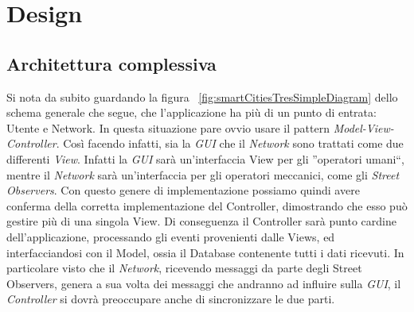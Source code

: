 \documentclass[a4paper,12pt]{report}
\begin{document}
\chapter{Design}

\section{Architettura complessiva}

Si nota da subito guardando la figura 
~\ref{fig:smartCitiesTresSimpleDiagram} dello schema generale che segue, 
che l'applicazione ha più di un punto di entrata: Utente e Network. In questa 
situazione pare ovvio usare il pattern \textit{Model-View-Controller}. Così 
facendo infatti, sia la \textit{GUI} che il \textit{Network} sono trattati come 
due differenti \textit{View}. Infatti la \textit{GUI} sarà un'interfaccia View 
per gli ''operatori umani``, mentre il \textit{Network} sarà un'interfaccia per 
gli operatori meccanici, come gli \textit{Street Observers}.
Con questo genere di implementazione possiamo quindi avere conferma della 
corretta implementazione del Controller, dimostrando che esso può gestire più di 
una singola View.\newline
Di conseguenza il Controller sarà punto cardine dell'applicazione, processando 
gli eventi provenienti dalle Views, ed interfacciandosi con il Model, ossia il 
Database contenente tutti i dati ricevuti. 
In particolare visto che il \textit{Network}, ricevendo messaggi da parte degli 
Street Observers, genera a sua volta dei messaggi che andranno ad influire 
sulla \textit{GUI}, il \textit{Controller} si dovrà preoccupare anche di 
sincronizzare le due parti.
\newpage
\end{document}
